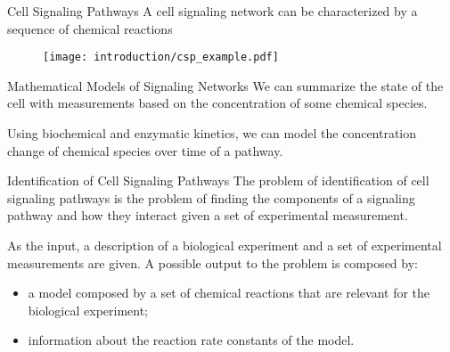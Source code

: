 \documentclass{beamer}
\begin{document}
\begin{frame}{Cell Signaling Pathways}
A cell signaling network can be characterized by a sequence of chemical 
reactions 
\begin{figure}
    \texttt{[image: introduction/csp\_example.pdf]}
\end{figure}
\end{frame}

\begin{frame}{Mathematical Models of Signaling Networks}
We can summarize the state of the cell with measurements based on the 
concentration of some chemical species.
\pause

Using biochemical and enzymatic kinetics, we can model the concentration
change of chemical species over time of a pathway.
\end{frame}






\begin{frame}{Identification of Cell Signaling Pathways}
The problem of identification of cell signaling pathways is the problem
of finding the components of a signaling pathway and how they interact
given a set of experimental measurement.

\pause
As the input, a description of a biological experiment and a set of 
experimental measurements are given. \pause A possible output to the 
problem is composed by:
\begin{itemize}
    \pause
    \item{a model composed by a set of chemical reactions that are 
        relevant for the biological experiment;}
    \pause
    \item{information about the reaction rate constants of the model.}
\end{itemize}
\end{frame}
\end{document}

